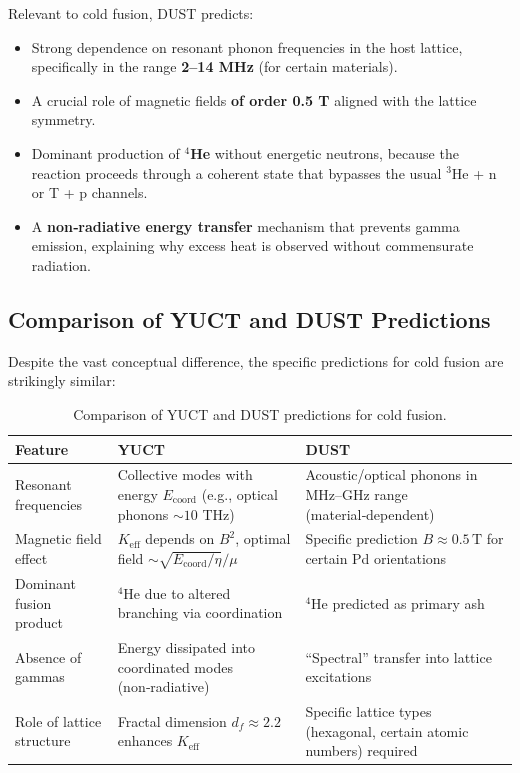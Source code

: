 \documentclass[12pt]{article}
\theoremstyle{remark}
\newcommand{\Keff}{K_{\mathrm{eff}}}
\newcommand{\df}{d_{\!f}}
\begin{document}
	Relevant to cold fusion, DUST predicts:
	\begin{itemize}
		\item Strong dependence on resonant phonon frequencies in the host lattice, specifically in the range \textbf{2–14 MHz} (for certain materials).
		\item A crucial role of magnetic fields \textbf{of order 0.5 T} aligned with the lattice symmetry.
		\item Dominant production of \textbf{\(^4\)He} without energetic neutrons, because the reaction proceeds through a coherent state that bypasses the usual \(^3\)He + n or T + p channels.
		\item A \textbf{non‑radiative energy transfer} mechanism that prevents gamma emission, explaining why excess heat is observed without commensurate radiation.
	\end{itemize}
	
	\subsection{Comparison of YUCT and DUST Predictions}
	
	Despite the vast conceptual difference, the specific predictions for cold fusion are strikingly similar:
	
	\begin{table}[htbp]
		\centering
		\caption{Comparison of YUCT and DUST predictions for cold fusion.}
		\label{tab:comparison}
		\small
		\begin{tabularx}{\textwidth}{l X X}
			\toprule
			\textbf{Feature} & \textbf{YUCT} & \textbf{DUST} \\
			\midrule
			Resonant frequencies & Collective modes with energy \(E_{\mathrm{coord}}\) (e.g., optical phonons \(\sim 10\) THz) & Acoustic/optical phonons in MHz–GHz range (material‑dependent) \\
			Magnetic field effect & \(\Keff\) depends on \(B^2\), optimal field \(\sim \sqrt{E_{\mathrm{coord}}/\eta}/\mu\) & Specific prediction \(B \approx 0.5\,\text{T}\) for certain Pd orientations \\
			Dominant fusion product & \(^4\)He due to altered branching via coordination & \(^4\)He predicted as primary ash \\
			Absence of gammas & Energy dissipated into coordinated modes (non‑radiative) & “Spectral” transfer into lattice excitations \\
			Role of lattice structure & Fractal dimension \(\df \approx 2.2\) enhances \(\Keff\) & Specific lattice types (hexagonal, certain atomic numbers) required \\
			\bottomrule
		\end{tabularx}
	\end{table}
	
\end{document}
